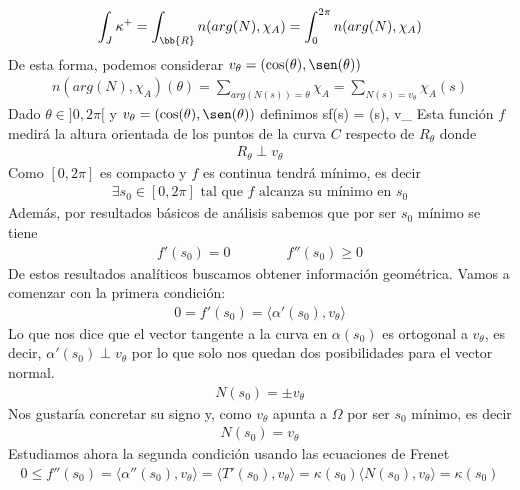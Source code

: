 \begin{ejemplo}
    \begin{gather*}
        \int_J \kappa^+ = \int_\bb{R} n(arg(N), \chi_A) = \int_0^{2\pi} n(arg(N), \chi_A)
    \end{gather*}
    De esta forma, podemos considerar $v_\theta = (\cos(\theta), \sen(\theta))$
    \begin{gather*}
        n(arg(N), \chi_A)(\theta) = \sum_{arg(N(s))=\theta} \chi_A = \sum_{N(s)=v_\theta} \chi_A(s)
    \end{gather*}
    Dado $\theta\in]0,2\pi[$ y $v_\theta = (\cos(\theta), \sen(\theta))$ definimos 
         {s}{f(s) = \langle \alpha(s), v_\theta \rangle}
    Esta función $f$ medirá la altura orientada de los puntos de la curva $C$ respecto de $R_\theta$ donde
    \begin{gather*}
        R_\theta \perp v_\theta
    \end{gather*}
    Como $[0,2\pi]$ es compacto y $f$ es continua tendrá mínimo, es decir
    \begin{gather*}
        \exists s_0\in [0,2\pi] \text{ tal que $f$ alcanza su mínimo en $s_0$} 
    \end{gather*}
    Además, por resultados básicos de análisis sabemos que por ser $s_0$ mínimo se tiene
    \begin{gather*}
        f'(s_0)=0 \qquad \qquad f''(s_0)\geq 0
    \end{gather*}
    De estos resultados analíticos buscamos obtener información geométrica. 
    Vamos a comenzar con la primera condición:
    \begin{gather*}
        0=f'(s_0) = \langle \alpha'(s_0), v_\theta \rangle
    \end{gather*}
    Lo que nos dice que el vector tangente a la curva en $\alpha(s_0)$ es ortogonal a $v_\theta$, es decir, $\alpha'(s_0)\perp v_\theta$ por lo que solo nos quedan dos posibilidades para el vector normal. 
    \begin{gather*}
        N(s_0) = \pm v_\theta
    \end{gather*}
    Nos gustaría concretar su signo y, como $v_\theta$ apunta a $\Omega$ por ser $s_0$ mínimo, es decir
    \begin{gather*}
        N(s_0)=v_\theta
    \end{gather*}
    Estudiamos ahora la segunda condición usando las ecuaciones de Frenet
    \begin{gather*}
        0 \leq f''(s_0) = \langle \alpha''(s_0), v_\theta \rangle = \langle T'(s_0), v_\theta \rangle = \kappa(s_0)\langle N(s_0), v_\theta \rangle = \kappa(s_0)

\end{gather*}
\end{ejemplo}
